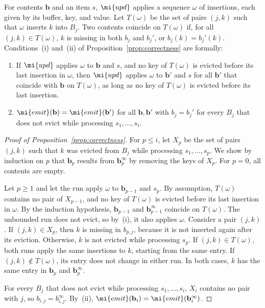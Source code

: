 For contents $\mathbf{b}$ and an item $s$, $\mi{upd}$ applies a sequence
$\omega$ of insertions, each given by its buffer, key, and value.
Let $T(\omega)$ be the set of pairs $(j, k)$ such that $\omega$ inserts $k$
into $B_j$.
Two contents coincide on $T(\omega)$ if, for all $(j, k) \in T(\omega)$, $k$
is missing in both $b_j$ and $b_j'$, or $b_j(k) = b_j'(k)$.
Conditions~(i) and~(ii) of Proposition~\ref{prop:correctness} are formally:
\begin{enumerate}
  \item[(i)] If $\mi{upd}$ applies $\omega$ to $\mathbf{b}$ and $s$, and no key
        of $T(\omega)$ is evicted before its last insertion in $\omega$, then
        $\mi{upd}$ applies $\omega$ to $\mathbf{b}'$ and $s$ for all
        $\mathbf{b}'$ that coincide with $\mathbf{b}$ on $T(\omega)$, as long
        as no key of $T(\omega)$ is evicted before its last insertion.
  \item[(ii)] $\mi{emit}(\mathbf{b}) = \mi{emit}(\mathbf{b}')$ for all
        $\mathbf{b}, \mathbf{b}'$ with $b_j = b_j'$ for every $B_j$ that does
        not evict while processing $s_1, \dots, s_i$.
\end{enumerate}

\begin{proof}[Proof of Proposition~\ref{prop:correctness}]
For $p \le i$, let $X_p$ be the set of pairs $(j, k)$ such that $k$ was evicted
from $B_j$ while processing $s_1, \dots, s_p$.
We show by induction on $p$ that $\mathbf{b}_p$ results from
$\mathbf{b}_p^\infty$ by removing the keys of $X_p$.
For $p = 0$, all contents are empty.

Let $p \ge 1$ and let the run apply $\omega$ to $\mathbf{b}_{p-1}$ and $s_p$.
By assumption, $T(\omega)$ contains no pair of $X_{p-1}$, and no key of
$T(\omega)$ is evicted before its last insertion in $\omega$.
By the induction hypothesis, $\mathbf{b}_{p-1}$ and $\mathbf{b}_{p-1}^\infty$
coincide on $T(\omega)$.
The unbounded run does not evict, so by~(i), it also applies $\omega$.
Consider a pair $(j, k)$.
If $(j, k) \in X_p$, then $k$ is missing in $b_{p, j}$, because it is not
inserted again after its eviction.
Otherwise, $k$ is not evicted while processing $s_p$.
If $(j, k) \in T(\omega)$, both runs apply the same insertions to $k$, starting
from the same entry.
If $(j, k) \notin T(\omega)$, its entry does not change in either run.
In both cases, $k$ has the same entry in $\mathbf{b}_p$ and
$\mathbf{b}_p^\infty$.

For every $B_j$ that does not evict while processing $s_1, \dots, s_i$, $X_i$
contains no pair with $j$, so $b_{i, j} = b_{i, j}^\infty$.
By~(ii), $\mi{emit}(\mathbf{b}_i) = \mi{emit}(\mathbf{b}_i^\infty)$.
\end{proof}

